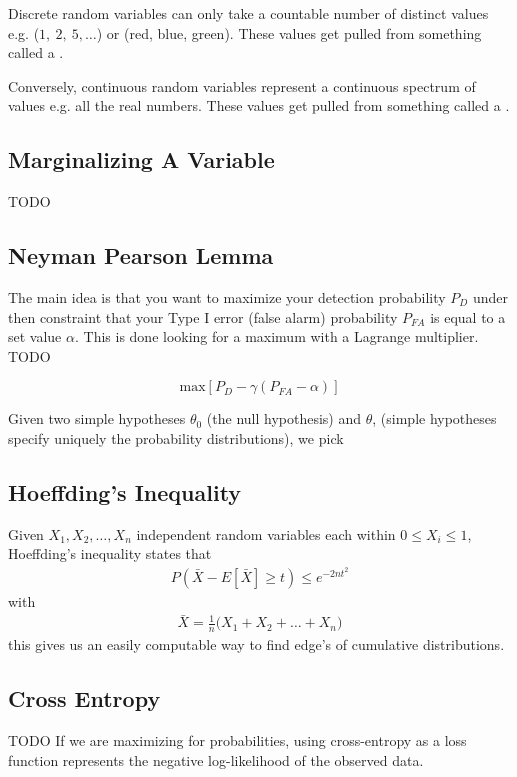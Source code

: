Discrete random variables can only take a countable number of distinct values e.g. ($1,~2, ~5,\ldots$) or (red, blue, green). These values get pulled from something called a .

Conversely, continuous random variables represent a continuous spectrum of values e.g. all the real numbers. These values get pulled from something called a .

\subsection{Marginalizing A Variable}
TODO

\subsection{Neyman Pearson Lemma}
The main idea is that you want to maximize your detection probability $P_D$ under then constraint that your Type I error (false alarm) probability $P_{FA}$ is equal to a set value $\alpha$. This is done looking for a maximum with a Lagrange multiplier. TODO

\begin{equation}
	\textrm{max}[P_D - \gamma(P_{FA}-\alpha)]
\end{equation}

Given two simple hypotheses $\theta_0$ (the null hypothesis) and $\theta$, (simple hypotheses specify uniquely the probability distributions), we pick 

\subsection{Hoeffding's Inequality}\label{hoeffding}
Given $X_1, X_2, \ldots, X_n$ independent random variables each within $0 \leq X_i \leq 1$, Hoeffding's inequality states that 
\begin{align}
	P(\bar{X} - E[\bar{X}] \geq t) \leq e^{-2nt^2}
\end{align}
with 
\begin{align}
	\bar{X} = \frac{1}{n}\Big(X_1+X_2+\ldots+X_n\Big)
\end{align}
this gives us an easily computable way to find edge's of cumulative distributions.
 
\subsection{Cross Entropy}
TODO
If we are maximizing for probabilities, using cross-entropy as a loss function represents the negative log-likelihood of the observed data\cite{grus}.

